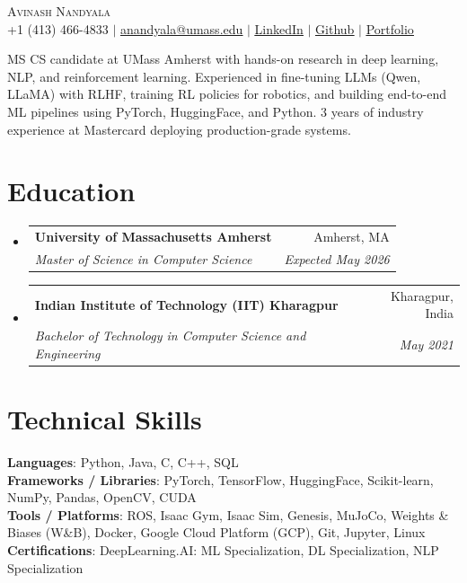 \documentclass[letterpaper,11pt]{article}
\makeatletter
\newcommand{\resumeSubheading}[4]{
  \vspace{-2pt}\item
    \begin{tabular*}{0.97\textwidth}[t]{l@{\extracolsep{\fill}}r}
      \textbf{#1} & #2 \\
      \textit{\small#3} & \textit{\small #4} \\
    \end{tabular*}\vspace{-7pt}
}
\newcommand{\resumeSubHeadingListStart}{\begin{itemize}[leftmargin=0.15in, label={}]}
\newcommand{\resumeSubHeadingListEnd}{\end{itemize}}
\makeatother
\begin{document}

\begin{center}
  {\Huge\textsc{Avinash Nandyala}} \\ \vspace{1pt}
  \small +1 (413) 466-4833 $|$ \href{mailto:anandyala@umass.edu}{\underline{anandyala@umass.edu}} $|$
  \href{https://www.linkedin.com/in/avinash-nandyala-06a88b199/}{\underline{LinkedIn}} $|$
  \href{https://github.com/navinash47}{\underline{Github}} $|$
  \href{https://navinash47.github.io/Portfolio/}{\underline{Portfolio}}
\end{center}

\begin{center}
  \small{MS CS candidate at UMass Amherst with hands-on research in deep learning, NLP, and reinforcement learning. Experienced in fine-tuning LLMs (Qwen, LLaMA) with RLHF, training RL policies for robotics, and building end-to-end ML pipelines using PyTorch, HuggingFace, and Python. 3 years of industry experience at Mastercard deploying production-grade systems.}
\end{center}

\section{Education}
\resumeSubHeadingListStart
  \resumeSubheading
    {University of Massachusetts Amherst}{Amherst, MA}
    {Master of Science in Computer Science}{Expected May 2026}
  \resumeSubheading
    {Indian Institute of Technology (IIT) Kharagpur}{Kharagpur, India}
    {Bachelor of Technology in Computer Science and Engineering}{May 2021}
\resumeSubHeadingListEnd


\section{Technical Skills}
\begin{itemize}[leftmargin=0.15in, label={}]
  \small{\item{
    \textbf{Languages}{: Python, Java, C, C++, SQL} \\
    \textbf{Frameworks / Libraries}{: PyTorch, TensorFlow, HuggingFace, Scikit-learn, NumPy, Pandas, OpenCV, CUDA} \\
    \textbf{Tools / Platforms}{: ROS, Isaac Gym, Isaac Sim, Genesis, MuJoCo, Weights \& Biases (W\&B), Docker, Google Cloud Platform (GCP), Git, Jupyter, Linux} \\
    \textbf{Certifications}{: DeepLearning.AI: ML Specialization, DL Specialization, NLP Specialization}
  }}
\end{itemize}
\end{document}
